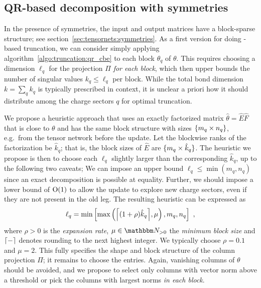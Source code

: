 
\subsection{QR-based decomposition with symmetries}
\label{subsec:trunaction:qr_tebd:symmetries}

In the presence of symmetries, the input and output matrices have a block-sparse structure; see section~\ref{sec:tensornets:symmetries}.
As a first version for doing -based truncation, we can consider simply applying algorithm~\ref{algo:truncation:qr_cbe} to each block $\theta_q$ of $\theta$.
This requires choosing a dimension $\ell_q$ for the projection $\Pi$ \emph{for each block}, which then upper bounds the number of singular values $k_q \leq \ell_q$ per block.
%
While the total bond dimension $k = \sum_q k_q$ is typically prescribed in  context, it is unclear a priori how it should distribute among the charge sectors $q$ for optimal truncation.

We propose a heuristic approach that uses an exactly factorized matrix $\hat\theta = \hat E \hat F$ that is close to $\theta$ and has the same block structure with sizes $\set{m_q \times n_q}$, e.g.~from the tensor network before the update.
%
Let the blockwise ranks of the factorization be $\hat k_q$; that is, the block sizes of $\hat E$ are $\set{m_q \times \hat k_q}$.
%
The heuristic we propose is then to choose each $\ell_q$ slightly larger than the corresponding $\hat{k}_q$, up to the following two caveats;
%
We can impose an upper bound $\ell_q \leq \min(m_q, n_q)$ since an exact decomposition is possible at equality.
%
Further, we should impose a lower bound of $\mathrm{O}(1)$ to allow the update to explore new charge sectors, even if they are not present in the old leg.
%
The resulting heuristic can be expressed as
\begin{equation}
    \ell_q = \min \sBr{
        \max \rBr{
            \ceil*{(1 + \rho) \hat{k}_q}, \mu
        },
        m_q, n_q
    }
    ~,
\end{equation}
where $\rho > 0$ is the \emph{expansion rate}, $\mu \in \Nbb_{> 0}$ the \emph{minimum block size} and $\lceil{-}\rceil$ denotes rounding to the next highest integer.
%
We typically choose $\rho = 0.1$ and $\mu = 2$.
%
This fully specifies the shape and block structure of the column projection $\Pi$; it remains to choose the entries.
%
Again, vanishing columns of $\theta$ should be avoided, and we propose to select only columns with vector norm above a threshold or pick the columns with largest norms \emph{in each block}.

